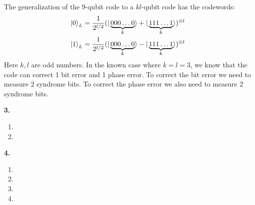 \documentclass{article}
\theoremstyle{definition}
\newcommand{\f}[2]{\frac{#1}{#2}}
\begin{document}
\noindent The generalization of the 9-qubit code to a $kl$-qubit code has the codewords:
\begin{align*}
	\ket{0}_L = \f{1}{2^{l/2}} ( |\underbrace{000\dots 0}_{k}\rangle + |\underbrace{111\dots 1}_{k}\rangle )^{\otimes l} \\
	\ket{1}_L = \f{1}{2^{l/2}} ( |\underbrace{000\dots 0}_{k}\rangle - |\underbrace{111\dots 1}_{k}\rangle )^{\otimes l}
\end{align*}
Here $k,l$ are odd numbers. In the known case where $k=l=3$, we know that the code can correct 1 bit error and 1 phase error. To correct the bit error we need to measure 2 syndrome bits. To correct the phase error we also need to  measure 2 syndrome bits. 





\noindent \textbf{3.}

\begin{enumerate}[label=(\alph*)]
	\item 
	
	\item 
	
\end{enumerate}


\noindent \textbf{4. }

\begin{enumerate}[label=(\alph*)]
	\item 
	
	\item 
	
	\item 
	
	\item 
\end{enumerate}
\end{document}
